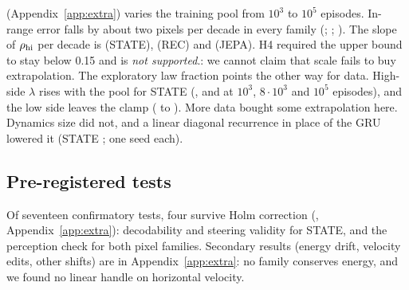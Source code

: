 (Appendix~\ref{app:extra}) varies the training pool from $10^3$ to $10^5$ episodes. In-range error falls by
about two pixels per decade in every family (\StateHfourErr; \RecHfourErr; \JepaHfourErr).
The slope of $\rho_{\rm hi}$ per decade is \StateHfourRho{} (STATE), \RecHfourRho{} (REC) and
\JepaHfourRho{} (JEPA). H4 required the upper bound to stay below 0.15 and is \emph{not supported}.:
we cannot claim that scale fails to buy extrapolation. The exploratory law fraction points the
other way for data. High-side $\lambda$ rises with the pool for STATE (\StateOneKLamHi,
\StateEightKLamHi{} and \StateLamNatHiPt{} at $10^3$, $8{\cdot}10^3$ and $10^5$ episodes), and the
low side leaves the clamp (\StateOneKLamLo{} to \StateLamNatLoPt). More data
bought some extrapolation here. Dynamics size did not, and a linear diagonal recurrence in place of the GRU lowered it
(STATE \StateLruLamHi; one seed each).


\subsection{Pre-registered tests}

Of seventeen confirmatory tests, four survive Holm correction (, Appendix~\ref{app:extra}): decodability and
steering validity for STATE, and the perception check for both pixel families. Secondary results (energy drift, velocity edits,
other shifts) are in Appendix~\ref{app:extra}: no family conserves energy, and we found no linear handle on
horizontal velocity.
